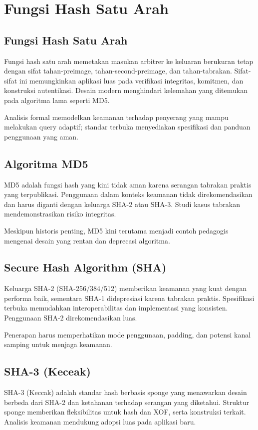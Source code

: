 \documentclass[../main.tex]{subfiles}
\begin{document}
\chapter{Fungsi Hash Satu Arah}

\section{Fungsi Hash Satu Arah}
Fungsi hash satu arah memetakan masukan arbitrer ke keluaran berukuran tetap dengan sifat tahan-preimage, tahan-second-preimage, dan tahan-tabrakan. Sifat-sifat ini memungkinkan aplikasi luas pada verifikasi integritas, komitmen, dan konstruksi autentikasi. Desain modern menghindari kelemahan yang ditemukan pada algoritma lama seperti MD5.

Analisis formal memodelkan keamanan terhadap penyerang yang mampu melakukan query adaptif; standar terbuka menyediakan spesifikasi dan panduan penggunaan yang aman.

\section{Algoritma MD5}
MD5 adalah fungsi hash yang kini tidak aman karena serangan tabrakan praktis yang terpublikasi. Penggunaan dalam konteks keamanan tidak direkomendasikan dan harus diganti dengan keluarga SHA-2 atau SHA-3. Studi kasus tabrakan mendemonstrasikan risiko integritas.

Meskipun historis penting, MD5 kini terutama menjadi contoh pedagogis mengenai desain yang rentan dan deprecasi algoritma.

\section{Secure Hash Algorithm (SHA)}
Keluarga SHA-2 (SHA-256/384/512) memberikan keamanan yang kuat dengan performa baik, sementara SHA-1 didepresiasi karena tabrakan praktis. Spesifikasi terbuka memudahkan interoperabilitas dan implementasi yang konsisten. Penggunaan SHA-2 direkomendasikan luas.

Penerapan harus memperhatikan mode penggunaan, padding, dan potensi kanal samping untuk menjaga keamanan.

\section{SHA-3 (Keceak)}
SHA-3 (Keccak) adalah standar hash berbasis sponge yang menawarkan desain berbeda dari SHA-2 dan ketahanan terhadap serangan yang diketahui. Struktur sponge memberikan fleksibilitas untuk hash dan XOF, serta konstruksi terkait. Analisis keamanan mendukung adopsi luas pada aplikasi baru.
\end{document}
